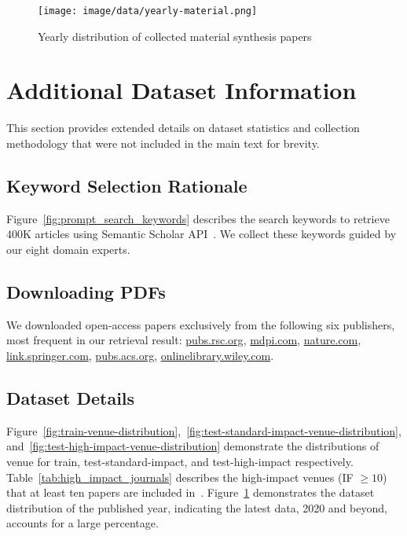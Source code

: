 




\begin{figure}
    \centering
    \texttt{[image: image/data/yearly-material.png]}
    \caption{Yearly distribution of collected material synthesis papers}
    \label{fig:data-yearly-distribution}
\end{figure}

\appendix
\section{Additional Dataset Information}
\label{sec:appendix_dataset}

This section provides extended details on dataset statistics and collection methodology that were not included in the main text for brevity.

\subsection{Keyword Selection Rationale}

Figure~\ref{fig:prompt_search_keywords} describes the search keywords to retrieve 400K articles using Semantic Scholar API~\cite{semanticscholar2023}. We collect these keywords guided by our eight domain experts.

\subsection{Downloading PDFs}
We downloaded open-access papers exclusively from the following six publishers, most frequent in our retrieval result: \href{https://pubs.rsc.org}{pubs.rsc.org}, \href{https://www.mdpi.com}{mdpi.com}, \href{https://www.nature.com}{nature.com}, \href{https://link.springer.com}{link.springer.com}, \href{https://pubs.acs.org}{pubs.acs.org}, \href{https://onlinelibrary.wiley.com}{onlinelibrary.wiley.com}.

\subsection{Dataset Details}
Figure~\ref{fig:train-venue-distribution},~\ref{fig:test-standard-impact-venue-distribution}, and~\ref{fig:test-high-impact-venue-distribution} demonstrate the distributions of venue for train, test-standard-impact, and test-high-impact respectively. Table~\ref{tab:high_impact_journals} describes the high-impact venues (IF $\geq 10$) that at least ten papers are included in~\oursdatashort. Figure~\ref{fig:data-yearly-distribution} demonstrates the dataset distribution of the published year, indicating the latest data, 2020 and beyond, accounts for a large percentage.


